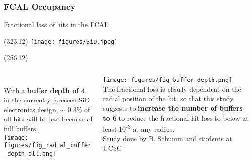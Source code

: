 \documentclass[xcolor={dvipsnames}]{beamer}
\newcommand{\sidlogo}{
  \setlength{\TPHorizModule}{1pt}
  \setlength{\TPVertModule}{1pt}
  \begin{textblock}{1}(323,12)
   \texttt{[image: figures/SiD.jpeg]}
  \end{textblock}
  }
\newcommand{\paper}{
  \setlength{\TPHorizModule}{1pt}
  \setlength{\TPVertModule}{1pt}
  \begin{textblock}{65}(256,12)
  \centering
  \textblockcolour{SpringGreen}
  \vspace*{0.8mm}{arXiv:\\1609.07816v1}\vspace*{0.8mm}
  \end{textblock}
}
\begin{document}
\subsubsection{FCAL Occupancy}
\begin{frame}{Fractional loss of hits in the FCAL}
\sidlogo
\paper
  \begin{columns}
   \begin{column}{0.52\textwidth}
     \vspace*{0.5cm}\\
     With a \textbf{buffer depth of 4} in the currently foreseen SiD electronics design, $\sim$ 0.3\% of all hits will be lost because of full buffers.\\
     \vspace*{1cm}
     \texttt{[image: figures/fig\_radial\_buffer\_depth\_all.png]}
   \end{column}
   \begin{column}{0.52\textwidth}
     \texttt{[image: figures/fig\_buffer\_depth.png]}\\
     The fractional loss is clearly dependent on the radial position of the hit, so that this study suggests to \textbf{increase the number of buffers to 6} to reduce the fractional hit loss to below at least 10\textsuperscript{-3} at any radius.\\
    {\hfill \tiny Study done by B. Schumm and students at UCSC}
   \end{column}
  \end{columns}
\end{frame}
\end{document}
